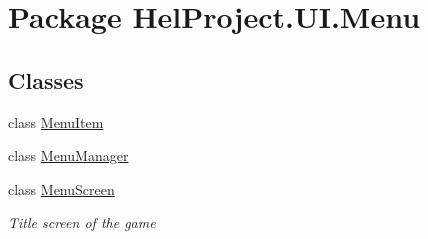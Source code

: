 \hypertarget{namespace_hel_project_1_1_u_i_1_1_menu}{}\section{Package Hel\+Project.\+U\+I.\+Menu}
\label{namespace_hel_project_1_1_u_i_1_1_menu}
\subsection*{Classes}
\begin{DoxyCompactItemize}
\item 
class \hyperlink{class_hel_project_1_1_u_i_1_1_menu_1_1_menu_item}{Menu\+Item}
\item 
class \hyperlink{class_hel_project_1_1_u_i_1_1_menu_1_1_menu_manager}{Menu\+Manager}
\item 
class \hyperlink{class_hel_project_1_1_u_i_1_1_menu_1_1_menu_screen}{Menu\+Screen}
\begin{DoxyCompactList}\small\item\em Title screen of the game \end{DoxyCompactList}\end{DoxyCompactItemize}
